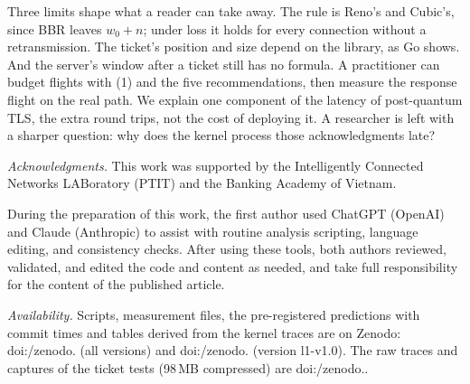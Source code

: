 \documentclass[sigconf,9pt,nonacm]{acmart}
\begin{document}
Three limits shape what a reader can take away. The rule is Reno's and Cubic's, since BBR leaves $w_0+n$; under loss it holds for every connection without a retransmission. The ticket's position and size depend on the library, as Go shows. And the server's window after a ticket still has no formula. A practitioner can budget flights with (1) and the five recommendations, then measure the response flight on the real path. We explain one component of the latency of post-quantum TLS, the extra round trips, not the cost of deploying it. A researcher is left with a sharper question: why does the kernel process those acknowledgments late?

\emph{Acknowledgments.} This work was supported by the Intelligently Connected Networks LABoratory (PTIT) and the Banking Academy of Vietnam. 
\par During the preparation of this work, the first author used ChatGPT (OpenAI) and Claude (Anthropic) to assist with routine analysis scripting, language editing, and consistency checks. After using these tools, both authors reviewed, validated, and edited the code and content as needed, and take full responsibility for the content of the published article.
\par\emph{Availability.} Scripts, measurement files, the pre-registered predictions with commit times and tables derived from the kernel traces are on Zenodo: doi:/\allowbreak zenodo. (all versions) and doi:/\allowbreak zenodo. (version l1-v1.0). The raw traces and captures of the ticket tests (98\,MB compressed) are doi:/\allowbreak zenodo..



\end{document}
